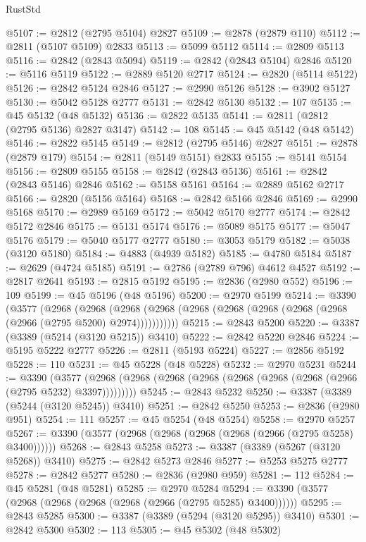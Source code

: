 \begin{lexlean}{RustStd}
\begin{coremodule}
@5107 := @2812 (@2795 @5104) @2827
@5109 := @2878 (@2879 @110)
@5112 := @2811 (@5107 @5109) @2833
@5113 := @5099 @5112
@5114 := @2809 @5113
@5116 := @2842 (@2843 @5094)
@5119 := @2842 (@2843 @5104) @2846
@5120 := @5116 @5119
@5122 := @2889 @5120 @2717
@5124 := @2820 (@5114 @5122)
@5126 := @2842 @5124 @2846
@5127 := @2990 @5126
@5128 := @3902 @5127
@5130 := @5042 @5128 @2777
@5131 := @2842 @5130
@5132 := 107
@5135 := @45 @5132 (@48 @5132)
@5136 := @2822 @5135
@5141 := @2811 (@2812 (@2795 @5136) @2827 @3147)
@5142 := 108
@5145 := @45 @5142 (@48 @5142)
@5146 := @2822 @5145
@5149 := @2812 (@2795 @5146) @2827
@5151 := @2878 (@2879 @179)
@5154 := @2811 (@5149 @5151) @2833
@5155 := @5141 @5154
@5156 := @2809 @5155
@5158 := @2842 (@2843 @5136)
@5161 := @2842 (@2843 @5146) @2846
@5162 := @5158 @5161
@5164 := @2889 @5162 @2717
@5166 := @2820 (@5156 @5164)
@5168 := @2842 @5166 @2846
@5169 := @2990 @5168
@5170 := @2989 @5169
@5172 := @5042 @5170 @2777
@5174 := @2842 @5172 @2846
@5175 := @5131 @5174
@5176 := @5089 @5175
@5177 := @5047 @5176
@5179 := @5040 @5177 @2777
@5180 := @3053 @5179
@5182 := @5038 (@3120 @5180)
@5184 := @4883 (@4939 @5182)
@5185 := @4780 @5184
@5187 := @2629 (@4724 @5185)
@5191 := @2786 (@2789 @796) @4612 @4527
@5192 := @2817 @2641
@5193 := @2815 @5192
@5195 := @2836 (@2980 @552)
@5196 := 109
@5199 := @45 @5196 (@48 @5196)
@5200 := @2970 @5199
@5214 := @3390
    (@3577
      (@2968
        (@2968
          (@2968 (@2968 (@2968 (@2968 (@2968 (@2968 (@2968 (@2966 (@2795 @5200) @2974)))))))))))
@5215 := @2843 @5200
@5220 := @3387 (@3389 (@5214 (@3120 @5215)) @3410)
@5222 := @2842 @5220 @2846
@5224 := @5195 @5222 @2777
@5226 := @2811 (@5193 @5224)
@5227 := @2856 @5192
@5228 := 110
@5231 := @45 @5228 (@48 @5228)
@5232 := @2970 @5231
@5244 := @3390
    (@3577 (@2968 (@2968 (@2968 (@2968 (@2968 (@2968 (@2968 (@2966 (@2795 @5232) @3397)))))))))
@5245 := @2843 @5232
@5250 := @3387 (@3389 (@5244 (@3120 @5245)) @3410)
@5251 := @2842 @5250
@5253 := @2836 (@2980 @951)
@5254 := 111
@5257 := @45 @5254 (@48 @5254)
@5258 := @2970 @5257
@5267 := @3390 (@3577 (@2968 (@2968 (@2968 (@2968 (@2966 (@2795 @5258) @3400))))))
@5268 := @2843 @5258
@5273 := @3387 (@3389 (@5267 (@3120 @5268)) @3410)
@5275 := @2842 @5273 @2846
@5277 := @5253 @5275 @2777
@5278 := @2842 @5277
@5280 := @2836 (@2980 @959)
@5281 := 112
@5284 := @45 @5281 (@48 @5281)
@5285 := @2970 @5284
@5294 := @3390 (@3577 (@2968 (@2968 (@2968 (@2968 (@2966 (@2795 @5285) @3400))))))
@5295 := @2843 @5285
@5300 := @3387 (@3389 (@5294 (@3120 @5295)) @3410)
@5301 := @2842 @5300
@5302 := 113
@5305 := @45 @5302 (@48 @5302)

\end{coremodule}
\end{lexlean}

